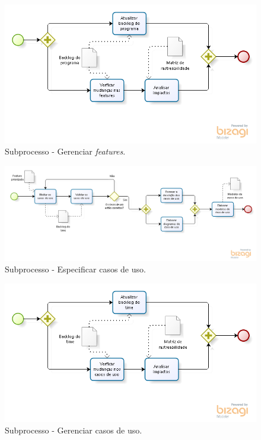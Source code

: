     \pagebreak
    \begin{figure}[!htbp]
      \centering
      \includegraphics[scale=0.55]{editaveis/figuras/processo_gerenciar_features}
      \caption[Subprocesso - Gerenciar \textit{features}]{Subprocesso - Gerenciar \textit{features}.}
      \label{processo_gerenciar_features}
    \end{figure}

    \begin{figure}[!htbp]
      \centering
      \includegraphics[scale=0.55]{editaveis/figuras/processo_especificar_casos_uso}
      \caption[Subprocesso - Especificar casos de uso]{Subprocesso - Especificar casos de uso.}
      \label{processo_especificar_casos_uso}
    \end{figure}

    \begin{figure}[!htbp]
      \centering
      \includegraphics[scale=0.55]{editaveis/figuras/processo_gerenciar_casos_uso}
      \caption[Subprocesso - Gerenciar casos de uso]{Subprocesso - Gerenciar casos de uso.}
      \label{processo_gerenciar_casos_uso}
    \end{figure}